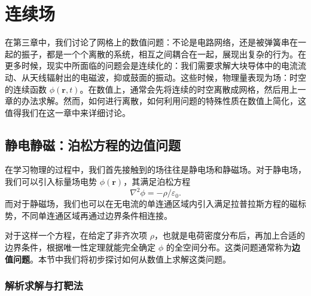 \chapter{连续场}

在第三章中，我们讨论了网格上的数值问题：不论是电路网络，还是被弹簧串在一起的振子，都是一个个离散的系统，相互之间耦合在一起，展现出复杂的行为。在更多时候，现实中所面临的问题会是连续化的：我们需要求解大块导体中的电流流动、从天线辐射出的电磁波，抑或鼓面的振动。这些时候，物理量表现为场：时空的连续函数 $\phi(\bm r,t)$。在数值上，通常会先将连续的时空离散成网格，然后用上一章的办法求解。然而，如何进行离散，如何利用问题的特殊性质在数值上简化，这值得我们在这一章中来详细讨论。

\section{静电静磁：泊松方程的边值问题}

在学习物理的过程中，我们首先接触到的场往往是静电场和静磁场。对于静电场，我们可以引入标量场电势 $\phi(\bm r)$，其满足泊松方程
\begin{equation}
\nabla^2\phi=-\rho/\varepsilon_0.
\tag{5.1.1}
\end{equation}
而对于静磁场，我们也可以在无电流的单连通区域内引入满足拉普拉斯方程的磁标势，不同单连通区域再通过边界条件相连接。

对于这样一个方程，在给定了非齐次项 $\rho$，也就是电荷密度分布后，再加上合适的边界条件，根据唯一性定理就能完全确定 $\phi$ 的全空间分布。这类问题通常称为\textbf{边值问题}。本节中我们将初步探讨如何从数值上求解这类问题。

\subsection{解析求解与打靶法}

